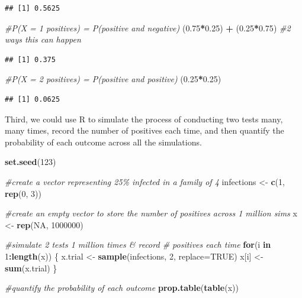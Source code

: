 \documentclass[
]{book}
\newenvironment{Shaded}{\begin{snugshade}}{\end{snugshade}}
\newcommand{\AttributeTok}[1]{\textcolor[rgb]{0.13,0.29,0.53}{#1}}
\newcommand{\CommentTok}[1]{\textcolor[rgb]{0.56,0.35,0.01}{\textit{#1}}}
\newcommand{\ConstantTok}[1]{\textcolor[rgb]{0.56,0.35,0.01}{#1}}
\newcommand{\ControlFlowTok}[1]{\textcolor[rgb]{0.13,0.29,0.53}{\textbf{#1}}}
\newcommand{\DecValTok}[1]{\textcolor[rgb]{0.00,0.00,0.81}{#1}}
\newcommand{\FloatTok}[1]{\textcolor[rgb]{0.00,0.00,0.81}{#1}}
\newcommand{\FunctionTok}[1]{\textcolor[rgb]{0.13,0.29,0.53}{\textbf{#1}}}
\newcommand{\NormalTok}[1]{#1}
\newcommand{\OtherTok}[1]{\textcolor[rgb]{0.56,0.35,0.01}{#1}}
\newcommand{\SpecialCharTok}[1]{\textcolor[rgb]{0.81,0.36,0.00}{\textbf{#1}}}
\begin{document}
\begin{verbatim}
## [1] 0.5625
\end{verbatim}

\begin{Shaded}
\begin{Highlighting}[]
\CommentTok{\#P(X = 1 positives) = P(positive and negative)}
\NormalTok{(}\FloatTok{0.75}\SpecialCharTok{*}\FloatTok{0.25}\NormalTok{) }\SpecialCharTok{+}\NormalTok{ (}\FloatTok{0.25}\SpecialCharTok{*}\FloatTok{0.75}\NormalTok{) }\CommentTok{\#2 ways this can happen}
\end{Highlighting}
\end{Shaded}

\begin{verbatim}
## [1] 0.375
\end{verbatim}

\begin{Shaded}
\begin{Highlighting}[]
\CommentTok{\#P(X = 2 positives) = P(positive and positive)}
\NormalTok{(}\FloatTok{0.25}\SpecialCharTok{*}\FloatTok{0.25}\NormalTok{) }
\end{Highlighting}
\end{Shaded}

\begin{verbatim}
## [1] 0.0625
\end{verbatim}

Third, we could use R to simulate the process of conducting two tests many, many times, record the number of positives each time, and then quantify the probability of each outcome across all the simulations.

\begin{Shaded}
\begin{Highlighting}[]
\FunctionTok{set.seed}\NormalTok{(}\DecValTok{123}\NormalTok{)}

\CommentTok{\#create a vector representing 25\% infected in a family of 4}
\NormalTok{infections }\OtherTok{\textless{}{-}} \FunctionTok{c}\NormalTok{(}\DecValTok{1}\NormalTok{, }\FunctionTok{rep}\NormalTok{(}\DecValTok{0}\NormalTok{, }\DecValTok{3}\NormalTok{))}

\CommentTok{\#create an empty vector to store the number of positives across 1 million sims}
\NormalTok{x }\OtherTok{\textless{}{-}} \FunctionTok{rep}\NormalTok{(}\ConstantTok{NA}\NormalTok{, }\DecValTok{1000000}\NormalTok{)}

\CommentTok{\#simulate 2 tests 1 million times \& record \# positives each time}
\ControlFlowTok{for}\NormalTok{(i }\ControlFlowTok{in} \DecValTok{1}\SpecialCharTok{:}\FunctionTok{length}\NormalTok{(x)) \{}
\NormalTok{  x.trial }\OtherTok{\textless{}{-}} \FunctionTok{sample}\NormalTok{(infections, }\DecValTok{2}\NormalTok{, }\AttributeTok{replace=}\ConstantTok{TRUE}\NormalTok{)}
\NormalTok{  x[i] }\OtherTok{\textless{}{-}} \FunctionTok{sum}\NormalTok{(x.trial)}
\NormalTok{\}}

\CommentTok{\#quantify the probability of each outcome}
\FunctionTok{prop.table}\NormalTok{(}\FunctionTok{table}\NormalTok{(x))}
\end{Highlighting}
\end{Shaded}
\end{document}
